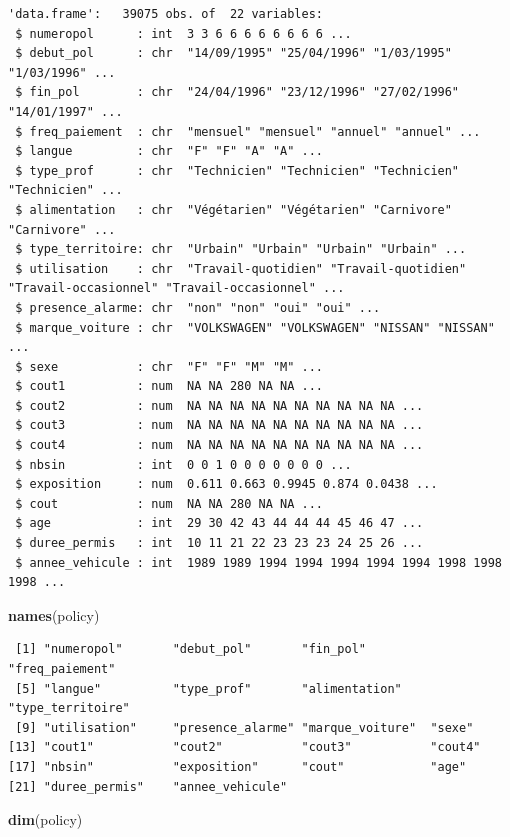 \documentclass[
]{book}
\newenvironment{Shaded}{\begin{snugshade}}{\end{snugshade}}
\newcommand{\KeywordTok}[1]{\textcolor[rgb]{0.13,0.29,0.53}{\textbf{#1}}}
\newcommand{\NormalTok}[1]{#1}
\begin{document}
\begin{verbatim}
'data.frame':	39075 obs. of  22 variables:
 $ numeropol      : int  3 3 6 6 6 6 6 6 6 6 ...
 $ debut_pol      : chr  "14/09/1995" "25/04/1996" "1/03/1995" "1/03/1996" ...
 $ fin_pol        : chr  "24/04/1996" "23/12/1996" "27/02/1996" "14/01/1997" ...
 $ freq_paiement  : chr  "mensuel" "mensuel" "annuel" "annuel" ...
 $ langue         : chr  "F" "F" "A" "A" ...
 $ type_prof      : chr  "Technicien" "Technicien" "Technicien" "Technicien" ...
 $ alimentation   : chr  "Végétarien" "Végétarien" "Carnivore" "Carnivore" ...
 $ type_territoire: chr  "Urbain" "Urbain" "Urbain" "Urbain" ...
 $ utilisation    : chr  "Travail-quotidien" "Travail-quotidien" "Travail-occasionnel" "Travail-occasionnel" ...
 $ presence_alarme: chr  "non" "non" "oui" "oui" ...
 $ marque_voiture : chr  "VOLKSWAGEN" "VOLKSWAGEN" "NISSAN" "NISSAN" ...
 $ sexe           : chr  "F" "F" "M" "M" ...
 $ cout1          : num  NA NA 280 NA NA ...
 $ cout2          : num  NA NA NA NA NA NA NA NA NA NA ...
 $ cout3          : num  NA NA NA NA NA NA NA NA NA NA ...
 $ cout4          : num  NA NA NA NA NA NA NA NA NA NA ...
 $ nbsin          : int  0 0 1 0 0 0 0 0 0 0 ...
 $ exposition     : num  0.611 0.663 0.9945 0.874 0.0438 ...
 $ cout           : num  NA NA 280 NA NA ...
 $ age            : int  29 30 42 43 44 44 44 45 46 47 ...
 $ duree_permis   : int  10 11 21 22 23 23 23 24 25 26 ...
 $ annee_vehicule : int  1989 1989 1994 1994 1994 1994 1994 1998 1998 1998 ...
\end{verbatim}

\begin{Shaded}
\begin{Highlighting}[]
\KeywordTok{names}\NormalTok{(policy)}
\end{Highlighting}
\end{Shaded}

\begin{verbatim}
 [1] "numeropol"       "debut_pol"       "fin_pol"         "freq_paiement"  
 [5] "langue"          "type_prof"       "alimentation"    "type_territoire"
 [9] "utilisation"     "presence_alarme" "marque_voiture"  "sexe"           
[13] "cout1"           "cout2"           "cout3"           "cout4"          
[17] "nbsin"           "exposition"      "cout"            "age"            
[21] "duree_permis"    "annee_vehicule" 
\end{verbatim}

\begin{Shaded}
\begin{Highlighting}[]
\KeywordTok{dim}\NormalTok{(policy)}
\end{Highlighting}
\end{Shaded}
\end{document}
